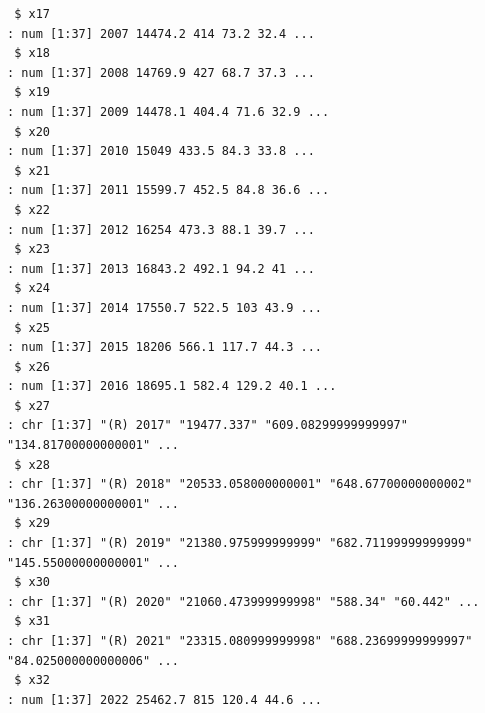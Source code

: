 \documentclass[
  letterpaper,
  DIV=11,
  numbers=noendperiod]{scrreprt}
\begin{document}
\begin{verbatim}
 $ x17                                                                                                                : num [1:37] 2007 14474.2 414 73.2 32.4 ...
 $ x18                                                                                                                : num [1:37] 2008 14769.9 427 68.7 37.3 ...
 $ x19                                                                                                                : num [1:37] 2009 14478.1 404.4 71.6 32.9 ...
 $ x20                                                                                                                : num [1:37] 2010 15049 433.5 84.3 33.8 ...
 $ x21                                                                                                                : num [1:37] 2011 15599.7 452.5 84.8 36.6 ...
 $ x22                                                                                                                : num [1:37] 2012 16254 473.3 88.1 39.7 ...
 $ x23                                                                                                                : num [1:37] 2013 16843.2 492.1 94.2 41 ...
 $ x24                                                                                                                : num [1:37] 2014 17550.7 522.5 103 43.9 ...
 $ x25                                                                                                                : num [1:37] 2015 18206 566.1 117.7 44.3 ...
 $ x26                                                                                                                : num [1:37] 2016 18695.1 582.4 129.2 40.1 ...
 $ x27                                                                                                                : chr [1:37] "(R) 2017" "19477.337" "609.08299999999997" "134.81700000000001" ...
 $ x28                                                                                                                : chr [1:37] "(R) 2018" "20533.058000000001" "648.67700000000002" "136.26300000000001" ...
 $ x29                                                                                                                : chr [1:37] "(R) 2019" "21380.975999999999" "682.71199999999999" "145.55000000000001" ...
 $ x30                                                                                                                : chr [1:37] "(R) 2020" "21060.473999999998" "588.34" "60.442" ...
 $ x31                                                                                                                : chr [1:37] "(R) 2021" "23315.080999999998" "688.23699999999997" "84.025000000000006" ...
 $ x32                                                                                                                : num [1:37] 2022 25462.7 815 120.4 44.6 ...
\end{verbatim}
\end{document}
